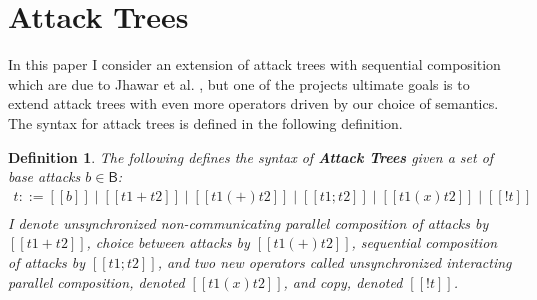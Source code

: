 \documentclass{sigplanconf}
\newtheorem{definition}[theorem]{Definition}
\begin{document}
\section{Attack Trees}
\label{sec:attack_trees}
In this paper I consider an extension of attack trees with sequential
composition which are due to Jhawar et al. \cite{Jhawar:2015}, but one
of the projects ultimate goals is to extend attack trees with even
more operators driven by our choice of semantics.  The syntax for
attack trees is defined in the following definition.
\begin{definition}
  \label{def:atrees}
  The following defines the syntax of \textbf{Attack Trees} given a set
  of base attacks $b \in \mathsf{B}$:
  \[
  \begin{array}{lll}
    t ::= [[b]] \mid [[t1 + t2]] \mid [[t1 (+) t2]] \mid [[t1;t2]] \mid [[t1 (x) t2]] \mid [[! t ]]\\
  \end{array}
  \]
  I denote unsynchronized non-communicating parallel composition of
  attacks by $[[t1 + t2]]$, choice between attacks by $[[t1 (+) t2]]$,
  sequential composition of attacks by $[[t1;t2]]$, and two new
  operators called unsynchronized interacting parallel composition,
  denoted $[[t1 (x) t2]]$, and copy, denoted $[[! t]]$.


\end{definition}
\end{document}
